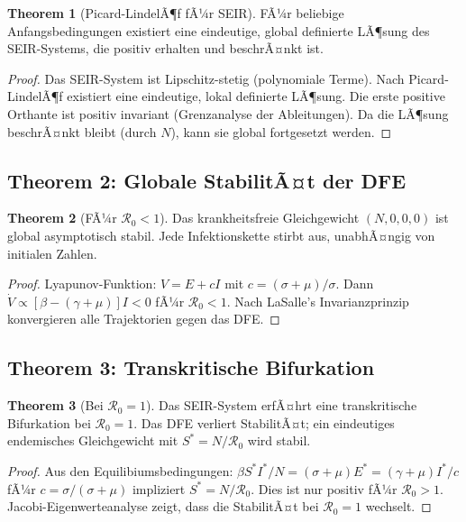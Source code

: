 ﻿\documentclass[a4paper,12pt,twoside]{article}
\theoremstyle{definition}
\newtheorem{theorem}{Theorem}[section]
\begin{document}
\begin{theorem}[Picard-LindelÃ¶f fÃ¼r SEIR]
FÃ¼r beliebige Anfangsbedingungen existiert eine eindeutige, global definierte LÃ¶sung des SEIR-Systems, die positiv erhalten und beschrÃ¤nkt ist.
\end{theorem}

\begin{proof}
Das SEIR-System ist Lipschitz-stetig (polynomiale Terme). Nach Picard-LindelÃ¶f existiert eine eindeutige, lokal definierte LÃ¶sung. Die erste positive Orthante ist positiv invariant (Grenzanalyse der Ableitungen). Da die LÃ¶sung beschrÃ¤nkt bleibt (durch $N$), kann sie global fortgesetzt werden.
\end{proof}

\subsection{Theorem 2: Globale StabilitÃ¤t der DFE}

\begin{theorem}[FÃ¼r $\mathcal{R}_0 < 1$]
Das krankheitsfreie Gleichgewicht $(N, 0, 0, 0)$ ist global asymptotisch stabil. Jede Infektionskette stirbt aus, unabhÃ¤ngig von initialen Zahlen.
\end{theorem}

\begin{proof}
Lyapunov-Funktion: $V = E + c I$ mit $c = (\sigma + \mu) / \sigma$. Dann $\dot{V} \propto [\beta - (\gamma + \mu)] I < 0$ fÃ¼r $\mathcal{R}_0 < 1$. Nach LaSalle's Invarianzprinzip konvergieren alle Trajektorien gegen das DFE.
\end{proof}

\subsection{Theorem 3: Transkritische Bifurkation}

\begin{theorem}[Bei $\mathcal{R}_0 = 1$]
Das SEIR-System erfÃ¤hrt eine transkritische Bifurkation bei $\mathcal{R}_0 = 1$. Das DFE verliert StabilitÃ¤t; ein eindeutiges endemisches Gleichgewicht mit $S^* = N / \mathcal{R}_0$ wird stabil.
\end{theorem}

\begin{proof}
Aus den Equilibiumsbedingungen: $\beta S^* I^* / N = (\sigma + \mu) E^* = (\gamma + \mu) I^* / c$ fÃ¼r $c = \sigma / (\sigma + \mu)$ impliziert $S^* = N / \mathcal{R}_0$. Dies ist nur positiv fÃ¼r $\mathcal{R}_0 > 1$. Jacobi-Eigenwerteanalyse zeigt, dass die StabilitÃ¤t bei $\mathcal{R}_0 = 1$ wechselt.
\end{proof}
\end{document}

